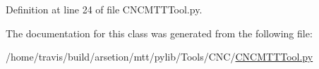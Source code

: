 Definition at line 24 of file C\-N\-C\-M\-T\-T\-Tool.\-py.



The documentation for this class was generated from the following file\-:\begin{DoxyCompactItemize}
\item 
/home/travis/build/arsetion/mtt/pylib/\-Tools/\-C\-N\-C/\hyperlink{CNCMTTTool_8py}{C\-N\-C\-M\-T\-T\-Tool.\-py}\end{DoxyCompactItemize}
